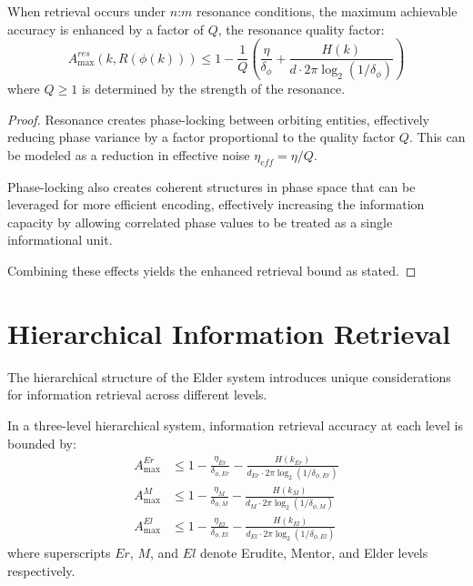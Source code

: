 \begin{theorem}
When retrieval occurs under $n$:$m$ resonance conditions, the maximum achievable accuracy is enhanced by a factor of $Q$, the resonance quality factor:
\begin{equation}
A_{\max}^{res}(k, R(\phi(k))) \leq 1 - \frac{1}{Q}\left(\frac{\eta}{\delta_\phi} + \frac{H(k)}{d \cdot 2\pi \log_2(1/\delta_\phi)}\right)
\end{equation}
where $Q \geq 1$ is determined by the strength of the resonance.
\end{theorem}

\begin{proof}
Resonance creates phase-locking between orbiting entities, effectively reducing phase variance by a factor proportional to the quality factor $Q$. This can be modeled as a reduction in effective noise $\eta_{eff} = \eta/Q$.

Phase-locking also creates coherent structures in phase space that can be leveraged for more efficient encoding, effectively increasing the information capacity by allowing correlated phase values to be treated as a single informational unit.

Combining these effects yields the enhanced retrieval bound as stated.
\end{proof}

\section{Hierarchical Information Retrieval}

The hierarchical structure of the Elder system introduces unique considerations for information retrieval across different levels.

\begin{theorem}
In a three-level hierarchical system, information retrieval accuracy at each level is bounded by:
\begin{align}
A_{\max}^{Er} &\leq 1 - \frac{\eta_{Er}}{\delta_{\phi,Er}} - \frac{H(k_{Er})}{d_{Er} \cdot 2\pi \log_2(1/\delta_{\phi,Er})} \\
A_{\max}^{M} &\leq 1 - \frac{\eta_{M}}{\delta_{\phi,M}} - \frac{H(k_{M})}{d_{M} \cdot 2\pi \log_2(1/\delta_{\phi,M})} \\
A_{\max}^{El} &\leq 1 - \frac{\eta_{El}}{\delta_{\phi,El}} - \frac{H(k_{El})}{d_{El} \cdot 2\pi \log_2(1/\delta_{\phi,El})}
\end{align}
where superscripts $Er$, $M$, and $El$ denote Erudite, Mentor, and Elder levels respectively.
\end{theorem}


